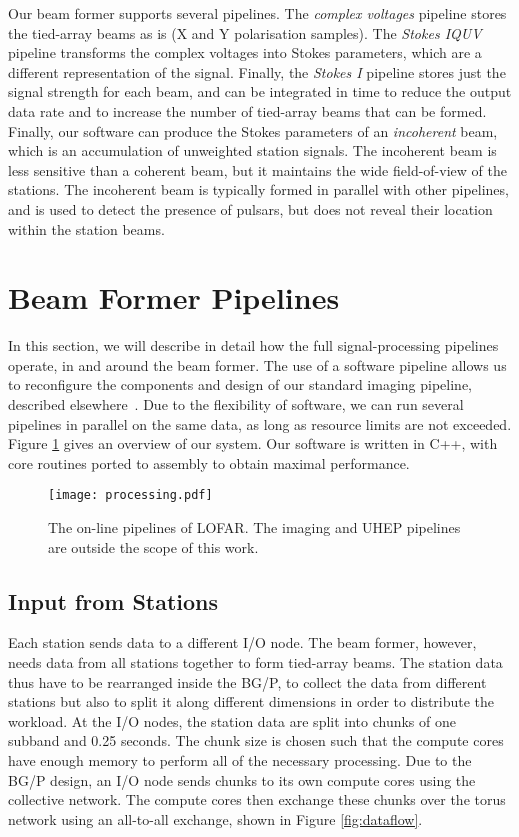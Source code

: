 \documentclass{llncs}
\begin{document}
Our beam former supports several pipelines. The \emph{complex voltages} pipeline stores the tied-array beams as is (X and Y polarisation samples). The \emph{Stokes IQUV} pipeline transforms the complex voltages into Stokes parameters, which are a different representation of the signal. Finally, the \emph{Stokes I} pipeline stores just the signal strength for each beam, and can be integrated in time to reduce the output data rate and to increase the number of tied-array beams that can be formed. Finally, our software can produce the Stokes parameters of an \emph{incoherent} beam, which is an accumulation of unweighted station signals. The incoherent beam is less sensitive than a coherent beam, but it maintains the wide field-of-view of the stations. The incoherent beam is typically formed in parallel with other pipelines, and is used to detect the presence of pulsars, but does not reveal their location within the station beams.

\section{Beam Former Pipelines}
\label{Sec:pipelines}

In this section, we will describe in detail how the full signal-processing pipelines operate, in and around the beam former. The use of a software pipeline allows us to reconfigure the components and design of our standard imaging pipeline, described elsewhere~\cite{Romein:10a}. Due to the flexibility of software, we can run several pipelines in parallel on the same data, as long as resource limits are not exceeded. Figure \ref{fig:processing} gives an overview of our system. Our software is written in C++, with core routines ported to assembly to obtain maximal performance.

\begin{figure}[ht]
\center
\texttt{[image: processing.pdf]}
\caption{The on-line pipelines of LOFAR. The imaging and UHEP pipelines are outside the scope of this work.}
\label{fig:processing}
\end{figure}

\subsection{Input from Stations}
Each station sends data to a different I/O node. The beam former, however, needs data from all stations together to form tied-array beams. The station data thus have to be rearranged inside the BG/P, to collect the data from different stations but also to split it along different dimensions in order to distribute the workload. At the I/O nodes, the station data are split into chunks of one subband and 0.25 seconds. The chunk size is chosen such that the compute cores have enough memory to perform all of the necessary processing. Due to the BG/P design, an I/O node sends chunks to its own compute cores using the collective network. The compute cores then exchange these chunks over the torus network using an all-to-all exchange, shown in Figure \ref{fig:dataflow}.
\end{document}
